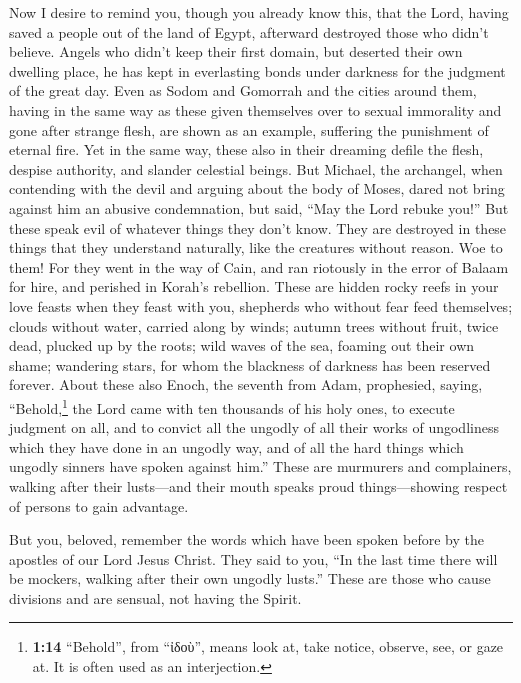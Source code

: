  Now I desire to remind you, though you already know this,
that the Lord, having saved a people out of the land of Egypt, afterward
destroyed those who didn't believe.  Angels who didn't
keep their first domain, but deserted their own dwelling place, he has
kept in everlasting bonds under darkness for the judgment of the great
day.  Even as Sodom and Gomorrah and the cities around
them, having in the same way as these given themselves over to sexual
immorality and gone after strange flesh, are shown as an example,
suffering the punishment of eternal fire.  Yet in the same
way, these also in their dreaming defile the flesh, despise authority,
and slander celestial beings.  But Michael, the archangel,
when contending with the devil and arguing about the body of Moses,
dared not bring against him an abusive condemnation, but said, ``May the
Lord rebuke you!''  But these speak evil of whatever
things they don't know. They are destroyed in these things that they
understand naturally, like the creatures without reason. 
Woe to them! For they went in the way of Cain, and ran riotously in the
error of Balaam for hire, and perished in Korah's rebellion.
 These are hidden rocky reefs in your love feasts when
they feast with you, shepherds who without fear feed themselves; clouds
without water, carried along by winds; autumn trees without fruit, twice
dead, plucked up by the roots;  wild waves of the sea,
foaming out their own shame; wandering stars, for whom the blackness of
darkness has been reserved forever.  About these also
Enoch, the seventh from Adam, prophesied, saying, ``Behold,\footnote{\textbf{1:14}
  ``Behold'', from ``ἰδοὺ'', means look at, take notice, observe, see,
  or gaze at. It is often used as an interjection.} the Lord came with
ten thousands of his holy ones,  to execute judgment on
all, and to convict all the ungodly of all their works of ungodliness
which they have done in an ungodly way, and of all the hard things which
ungodly sinners have spoken against him.''  These are
murmurers and complainers, walking after their lusts---and their mouth
speaks proud things---showing respect of persons to gain advantage.

 But you, beloved, remember the words which have been
spoken before by the apostles of our Lord Jesus Christ. 
They said to you, ``In the last time there will be mockers, walking
after their own ungodly lusts.''  These are those who
cause divisions and are sensual, not having the Spirit.

